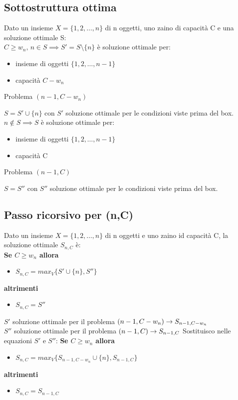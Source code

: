 \subsection{Sottostruttura ottima}
Dato un insieme $X=\{1,2,\dots,n\}$ di n oggetti, uno zaino di capacità C e una soluzione
ottimale S:\\
$C \geq w_n, \, n \in S \implies S' = S \setminus\{n\}$ è soluzione ottimale per:
\begin{itemize}
    \item insieme di oggetti $\{1,2,\dots, n-1\}$
    \item capacità $C-w_n$
\end{itemize}
\begin{mdframed}[backgroundcolor=lightgray]
    Problema $(n-1, C-w_n)$    
\end{mdframed}
\textbf{$S = S' \cup \{n\}$} con $S'$ soluzione ottimale per le condizioni viste prima del box.
$n \notin S \implies S$ è soluzione ottimale per:
\begin{itemize}
    \item insieme di oggetti $\{1,2,\dots,n-1\}$
    \item capacità C
\end{itemize}
\begin{mdframed}
    Problema $(n-1,C)$
\end{mdframed}
$S = S''$ con $S''$ soluzione ottimale per le condizioni viste prima del box.
\subsection{Passo ricorsivo per (n,C)}
Dato un insieme $X=\{1,2,\dots,n\}$ di n oggetti e uno zaino id capacità C, la soluzione
ottimale $S_{n,C}$ è:\\
\textbf{Se $C \geq w_n$ allora}
\begin{itemize}
    \item $S_{n,C} = max_V\{S' \cup \{n\},S''\}$
\end{itemize}
\textbf{altrimenti}
\begin{itemize}
    \item $S_{n,C} = S''$
\end{itemize}
$S'$ soluzione ottimale per il problema $(n-1, C-w_n) \rightarrow S_{n-1,C-w_n}$\\
$S''$ soluzione ottimale per il problema $(n-1,C) \rightarrow S_{n-1,C}$
Sostituisco nelle equazioni $S'$ e $S''$:
\textbf{Se $C \geq w_n$ allora}
\begin{itemize}
    \item $S_{n,C} = max_V\{S_{n-1, C-w_n} \cup \{n\},S_{n-1, C}\}$
\end{itemize}
\textbf{altrimenti}
\begin{itemize}
    \item $S_{n,C} = S_{n-1,C}$
\end{itemize}
